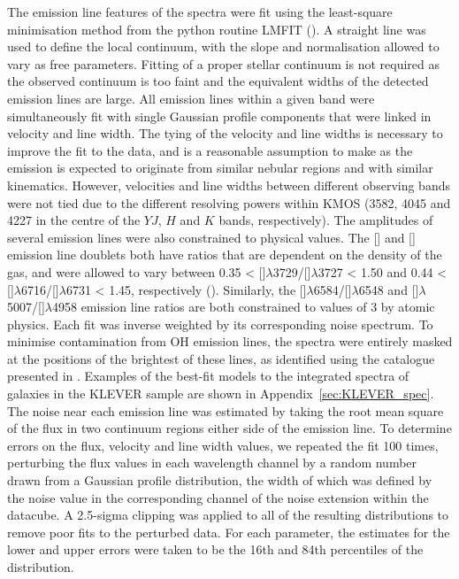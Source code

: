 \documentclass[usenatbib]{mnras} %
\begin{document}
The emission line features of the spectra were fit using the least-square minimisation method from the python routine LMFIT (\citealt{Newville_2016}). A straight line was used to define the local continuum, with the slope and normalisation allowed to vary as free parameters. Fitting of a proper stellar continuum is not required as the observed continuum is too faint and the equivalent widths of the detected emission lines are large. All emission lines within a given band were simultaneously fit with single Gaussian profile components that were linked in velocity and line width. The tying of the velocity and line widths is necessary to improve the fit to the data, and is a reasonable assumption to make as the emission is expected to originate from similar nebular regions and with similar kinematics. However, velocities and line widths between different observing bands were not tied due to the different resolving powers within KMOS (3582, 4045 and 4227 in the centre of the $YJ$, $H$ and $K$ bands, respectively). The amplitudes of several emission lines were also constrained to physical values. The [] and [] emission line doublets both have ratios that are dependent on the density of the gas, and were allowed to vary between 0.35 < []$\lambda$3729/[]$\lambda$3727 < 1.50 and 0.44 < []$\lambda$6716/[]$\lambda$6731 < 1.45, respectively (\citealt{Osterbrock_2006}). Similarly, the []$\lambda$6584/[]$\lambda$6548 and []$\lambda$5007/[]$\lambda$4958 emission line ratios are both constrained to values of 3 by atomic physics. Each fit was inverse weighted by its corresponding noise spectrum. To minimise contamination from OH emission lines, the spectra were entirely masked at the positions of the brightest of these lines, as identified using the catalogue presented in \cite{Rousselot_2000}. Examples of the best-fit models to the integrated spectra of galaxies in the KLEVER sample are shown in Appendix~\ref{sec:KLEVER_spec}. The noise near each emission line was estimated by taking the root mean square of the flux in two continuum regions either side of the emission line. To determine errors on the flux, velocity and line width values, we repeated the fit 100 times, perturbing the flux values in each wavelength channel by a random number drawn from a Gaussian profile distribution, the width of which was defined by the noise value in the corresponding channel of the noise extension within the datacube. A 2.5-sigma clipping was applied to all of the resulting distributions to remove poor fits to the perturbed data. For each parameter, the estimates for the lower and upper errors were taken to be the 16th and 84th percentiles of the distribution. 
\end{document}
